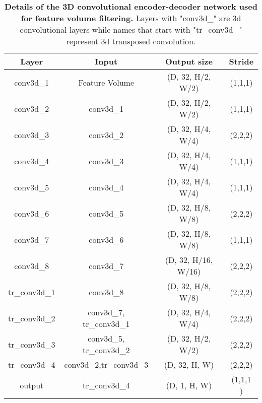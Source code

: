 \documentclass[runningheads]{llncs}
\begin{document}
\begin{table}[htb!]
\centering
\begin{tabular}{|c|c|c|c|}
\hline
Layer       & Input                  & Output size               & Stride  \\ \hline
conv3d\_1   & Feature Volume         & {(}D, 32, H/2, W/2{)}   & (1,1,1) \\ \hline
conv3d\_2   & conv3d\_1              & {(}D, 32, H/2, W/2{)}   & (1,1,1) \\ \hline
conv3d\_3   & conv3d\_2              & {(}D, 32, H/4, W/4{)}   & (2,2,2) \\ \hline
conv3d\_4   & conv3d\_3              & {(}D, 32, H/4, W/4{)}   & (1,1,1) \\ \hline
conv3d\_5   & conv3d\_4              & {(}D, 32, H/4, W/4{)}   & (1,1,1) \\ \hline
conv3d\_6   & conv3d\_5              & {(}D, 32, H/8, W/8{)}   & (2,2,2) \\ \hline
conv3d\_7   & conv3d\_6              & {(}D, 32, H/8, W/8{)}   & (1,1,1) \\ \hline
conv3d\_8   & conv3d\_7              & {(}D, 32, H/16, W/16{)} & (2,2,2) \\ \hline
tr\_conv3d\_1 & conv3d\_8              & {(}D, 32, H/8, W/8{)}   & (2,2,2) \\ \hline
tr\_conv3d\_2 & conv3d\_7, tr\_conv3d\_1 & {(}D, 32, H/4, W/4{)}   & (2,2,2) \\ \hline
tr\_conv3d\_3 & conv3d\_5, tr\_conv3d\_2 & {(}D, 32, H/2, W/2{)}   & (2,2,2) \\ \hline
tr\_conv3d\_4 & conv3d\_2,tr\_conv3d\_3  & {(}D, 32, H, W{)}         & (2,2,2) \\ \hline
output      & tr\_conv3d\_4            & {(}D, 1, H, W{)}         & (1,1,1 ) \\ \hline
\end{tabular}
\label{table:encdec}
\caption{\textbf{Details of the 3D convolutional encoder-decoder network used for feature volume filtering.} Layers with "conv3d\_" are 3d convolutional layers while names that start with "tr\_conv3d\_" represent 3d transposed convolution.}
\end{table}
\end{document}

